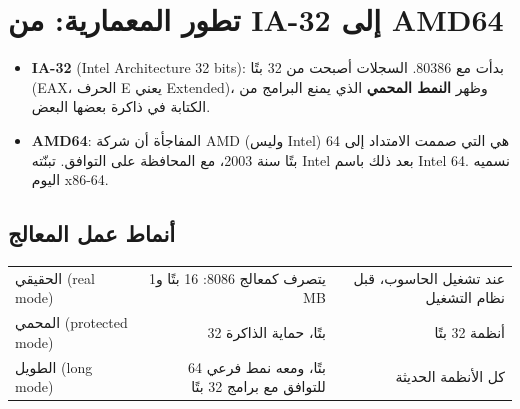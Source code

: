 \section{تطور المعمارية: من \textenglish{IA-32} إلى \textenglish{AMD64}}

\begin{center}
\end{center}

\begin{itemize}
    \item \textbf{\textenglish{IA-32}} \textenglish{(Intel Architecture 32 bits)}: بدأت مع \textenglish{80386}. السجلات أصبحت من 32 بتًا
          (\textenglish{EAX}، الحرف \textenglish{E} يعني \textenglish{Extended})، وظهر \textbf{النمط المحمي} الذي يمنع البرامج من
          الكتابة في ذاكرة بعضها البعض.
    \item \textbf{\textenglish{AMD64}}: المفاجأة أن شركة \textenglish{AMD} (وليس \textenglish{Intel}) هي التي صممت الامتداد إلى 64 بتًا سنة 2003،
          مع المحافظة على التوافق. تبنّته \textenglish{Intel} بعد ذلك باسم \textenglish{Intel 64}. نسميه اليوم \textenglish{x86-64}.
\end{itemize}

\subsection{أنماط عمل المعالج}
\begin{center}
\small
\begin{tabularx}{\linewidth}{|>{\centering\arraybackslash}p{3.3cm}|R|R|}
    \hline
     &  &  \\ \hline
    الحقيقي \textenglish{(real mode)} & يتصرف كمعالج \textenglish{8086}: 16 بتًا و\textenglish{1 MB} & عند تشغيل الحاسوب، قبل نظام التشغيل \\ \hline
    المحمي \textenglish{(protected mode)} & 32 بتًا، حماية الذاكرة & أنظمة 32 بتًا \\ \hline
    الطويل \textenglish{(long mode)} & 64 بتًا، ومعه نمط فرعي للتوافق مع برامج 32 بتًا & كل الأنظمة الحديثة \\ \hline
\end{tabularx}
\end{center}

